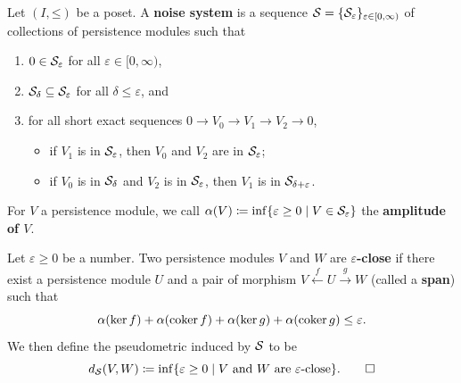 \begin{definition}
\label{!D:noise-system}
  Let $(I, \mathord{\leq})$ be a poset. A \textbf{noise system} is a sequence $\mathcal{S} = \{\mathcal{S}_\varepsilon\}_{\varepsilon \in [0, \infty)}$ of collections of persistence modules such that
  \begin{enumerate}
    \item $0 \in \mathcal{S}_\varepsilon$ for all $\varepsilon \in [0, \infty)$,
    \item $\mathcal{S}_\delta \subseteq \mathcal{S}_\varepsilon$ for all $\delta \leq \varepsilon$, and
    \item for all short exact sequences $0 \to V_0 \to V_1 \to V_2 \to 0$,
    \begin{itemize}
      \item if $V_1$ is in $\mathcal{S}_\varepsilon$, then $V_0$ and $V_2$ are in $\mathcal{S}_\varepsilon$;
      \item if $V_0$ is in $\mathcal{S}_\delta$ and $V_2$ is in $\mathcal{S}_\varepsilon$, then $V_1$ is in $\mathcal{S}_{\delta + \varepsilon}$.
    \end{itemize}
  \end{enumerate}
  For $V$ a persistence module, we call $\alpha(V) \coloneq \inf\{\varepsilon \geq 0 \mid V \in \mathcal{S}_\varepsilon\}$ the \textbf{amplitude of $V$}.
  
  Let $\varepsilon \geq 0$ be a number. Two persistence modules $V$ and $W$ are \textbf{$\varepsilon$-close} if there exist a persistence module $U$ and a pair of morphism $V \xleftarrow{f} U \xrightarrow{g} W$ (called a \textbf{span}) such that
  \begin{equation}
  \label{Eq:epsilon-close}
    \alpha(\ker f) + \alpha(\operatorname{coker} f) + \alpha(\ker g) + \alpha(\operatorname{coker} g) \leq \varepsilon.
  \end{equation}
  We then define the pseudometric induced by $\mathcal{S}$ to be
  \[
    d_{\mathcal{S}}(V, W) \coloneq \inf\{\varepsilon \geq 0 \mid \text{$V$ and $W$ are $\varepsilon$-close}\}.
    \qedhere
  \]
\end{definition}

